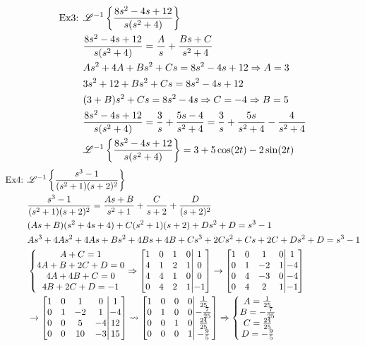 \documentclass[11pt, fleqn]{article}
\begin{document}
\begin{align*}
    \text{Ex3: }&\mathscr{L}^{-1}\left\{ \frac{8s^2-4s+12}{s(s^2+4)} \right\}\\
    &\frac{8s^2-4s+12}{s(s^2+4)}=\frac{A}{s}+\frac{Bs+C}{s^2+4}\\
    &As^2+4A+Bs^2+Cs=8s^2-4s+12\Rightarrow A=3\\
    &3s^2+12+Bs^2+Cs=8s^2-4s+12\\
    &(3+B)s^2+Cs=8s^2-4s\Rightarrow C=-4\Rightarrow B=5\\
    &\frac{8s^2-4s+12}{s(s^2+4)}=\frac{3}{s}+\frac{5s-4}{s^2+4}=\frac{3}{s}+\frac{5s}{s^2+4}-\frac{4}{s^2+4}\\
    &\mathscr{L}^{-1}\left\{ \frac{8s^2-4s+12}{s(s^2+4)} \right\}=3+5\cos(2t)-2\sin(2t)
\end{align*}
\begin{align*}
    \text{Ex4: }&\lap^{-1}\brcurly{\frac{s^3-1}{(s^2+1)(s+2)^2}}\\
    &\frac{s^3-1}{(s^2+1)(s+2)^2}=\frac{As+B}{s^2+1}+\frac{C}{s+2}+\frac{D}{(s+2)^2}\\
    &(As+B)(s^2+4s+4)+C(s^2+1)(s+2)+Ds^2+D=s^3-1\\
    &As^3+4As^2+4As+Bs^2+4Bs+4B+Cs^3+2Cs^2+Cs+2C+Ds^2+D=s^3-1\\
    &\eqnsystem{A+C=1\\4A+B+2C+D=0\\4A+4B+C=0\\4B+2C+D=-1}\Ra\augmatrix{1&0&1&0\\4&1&2&1\\4&4&1&0\\0&4&2&1}{1\\0\\0\\-1}\to\augmatrix{1&0&1&0\\0&1&-2&1\\0&4&-3&0\\0&4&2&1}{1\\-4\\-4\\-1}\\
    &\to\augmatrix{1&0&1&0\\0&1&-2&1\\0&0&5&-4\\0&0&10&-3}{1\\-4\\12\\15}\leadsto\augmatrix{1&0&0&0\\0&1&0&0\\0&0&1&0\\0&0&0&1}{\frac{1}{25}\\-\frac{7}{25}\\\frac{24}{25}\\-\frac{9}{5}}\Ra\eqnsystem{A=\frac{1}{25}\\B=-\frac{7}{25}\\C=\frac{24}{25}\\D=-\frac{9}{5}}\\

\end{align*}
\end{document}
